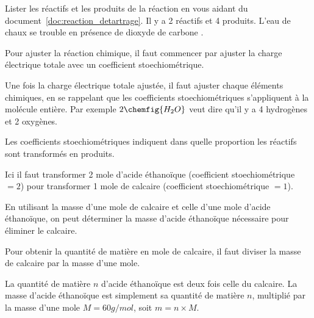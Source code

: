 \newpage
\pasDePagination
\setcounter{coupDePouceNum}{0}
\vspace*{-52pt}

%
\begin{coupDePouce}
  Lister les réactifs et les produits de la réaction en vous aidant du document~\ref{doc:reaction_detartrage}.
  Il y a 2 réactifs et 4 produits.
  L'eau de chaux se trouble en présence de dioxyde de carbone .
\end{coupDePouce}

%
\begin{coupDePouce}
  Pour ajuster la réaction chimique, il faut commencer par ajuster la charge électrique totale avec un coefficient stoechiométrique.
  
  Une fois la charge électrique totale ajustée, il faut ajuster chaque éléments chimiques, en se rappelant que les coefficients stoechiométriques s'appliquent à la molécule entière. 
  Par exemple $2\chemfig{H_2O}$ veut dire qu'il y a 4 hydrogènes et 2 oxygènes.
\end{coupDePouce}

%
\begin{coupDePouce}
  Les coefficients stoechiométriques indiquent dans quelle proportion les réactifs sont transformés en produits.
  
  Ici il faut transformer 2 mole d'acide éthanoïque (coefficient stoechiométrique $ = 2$) pour transformer 1 mole de calcaire (coefficient stoechiométrique $ = 1$).
  
  En utilisant la masse d'une mole de calcaire et celle d'une mole d'acide éthanoïque, on peut déterminer la masse d'acide éthanoïque nécessaire pour éliminer le calcaire.
\end{coupDePouce}

%
\begin{coupDePouce}
  Pour obtenir la quantité de matière en mole de calcaire, il faut diviser la masse de calcaire par la masse d'une mole.
  
  La quantité de matière $n$ d'acide éthanoïque est deux fois celle du calcaire.
  La masse d'acide éthanoïque est simplement sa quantité de matière $n$, multiplié par la masse d'une mole $M = 60 \unit{g / mol}$, soit $m = n \times M$.
\end{coupDePouce}

